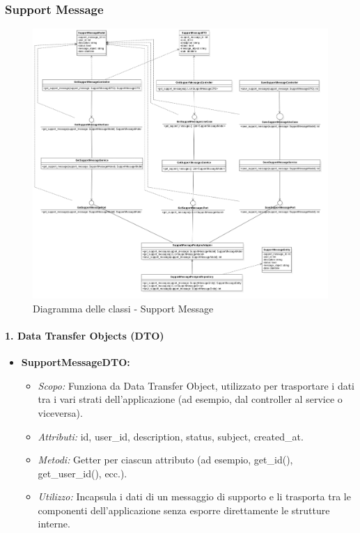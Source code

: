     \subsubsection{Support Message}

    \begin{figure}[H]
        \centering
        \includegraphics[width=\linewidth, height=0.8\textheight, keepaspectratio]{./img/png/Model6!SupportMessage_6.png}
        \caption{Diagramma delle classi - Support Message}
        \label{fig:support_message}
    \end{figure}

    \paragraph{1. Data Transfer Objects (DTO)}
    \begin{itemize}
        \item \textbf{SupportMessageDTO:}
        \begin{itemize}
            \item \textit{Scopo:} Funziona da Data Transfer Object, utilizzato per trasportare i dati tra i vari strati dell’applicazione (ad esempio, dal controller al service o viceversa).
            \item \textit{Attributi:} id, user\_id, description, status, subject, created\_at.
            \item \textit{Metodi:} Getter per ciascun attributo (ad esempio, get\_id(), get\_user\_id(), ecc.).
            \item \textit{Utilizzo:} Incapsula i dati di un messaggio di supporto e li trasporta tra le componenti dell’applicazione senza esporre direttamente le strutture interne.
        \end{itemize}
    \end{itemize}

